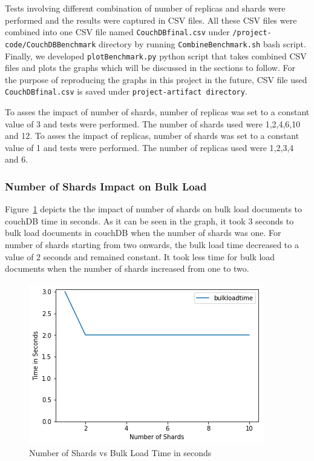 Tests involving different combination of number of replicas and shards
were performed and the results were captured in CSV files. All these
CSV files were combined into one CSV file named \verb|CouchDBfinal.csv| under
\verb|/project-code/CouchDBBenchmark| directory by running
\verb|CombineBenchmark.sh| bash script. Finally, we developed
\verb|plotBenchmark.py| python script that takes combined CSV files and plots
the graphs which will be discussed in the sections to follow. For the
purpose of reproducing the graphs in this project in the future, CSV file used
\verb|CouchDBfinal.csv| is saved under \verb|project-artifact directory|. 

To asses the impact of number of shards, number of replicas was set to a
constant value of 3 and tests were performed. The number of shards
used were 1,2,4,6,10 and 12. To asses the impact of replicas, number
of shards was set to a constant value of 1 and tests were
performed. The number of replicas used were 1,2,3,4 and 6.



\subsubsection{Number of Shards Impact on Bulk Load}


Figure~\ref{f:shard-bulk} depicts the the impact of number of shards
on bulk load documents to couchDB time in seconds. As it can be seen
in the graph, it took 3 seconds to bulk load documents in couchDB when
the number of shards was one. For number of shards starting from
two onwards, the bulk load time decreased to a value of 2 seconds and remained
constant. It took less time for bulk load documents when the number of
shards increased from one to two.

\begin{figure}[!ht]
  \centering\includegraphics[width=\columnwidth]{../images/ShardsBulkLoad.png}
  \caption{Number of Shards vs Bulk Load Time in seconds }\label{f:shard-bulk}
\end{figure}



